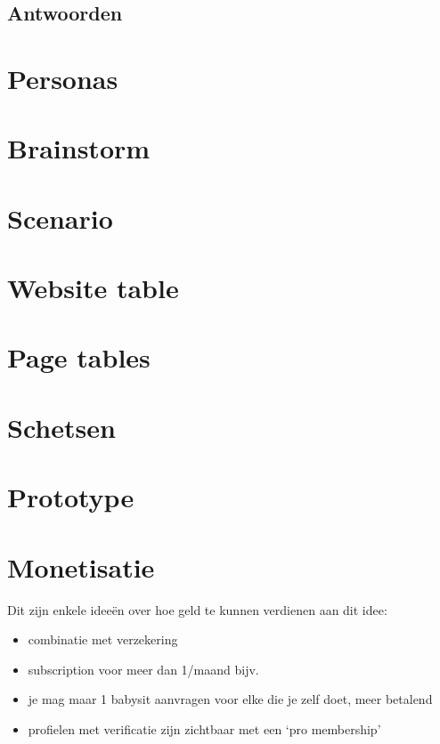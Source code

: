 \documentclass[a4paper,12pt]{article}
\begin{document}
\subsection{Antwoorden}

\section{Personas}

\section{Brainstorm}

\section{Scenario}

\section{Website table}

\section{Page tables}

\section{Schetsen}

\section{Prototype}

\section{Monetisatie}
Dit zijn enkele ideeën over hoe geld te kunnen verdienen aan dit idee:

\begin{itemize}
  \item combinatie met verzekering
  \item subscription voor meer dan 1/maand bijv.
  \item je mag maar 1 babysit aanvragen voor elke die je zelf doet, meer betalend
  \item profielen met verificatie zijn zichtbaar met een `pro membership'
\end{itemize}
\end{document}

